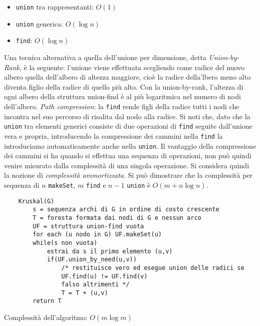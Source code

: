 \documentclass[12pt]{article}
\begin{document}
\begin{itemize}
    \item \texttt{union} tra rappresentanti: $O(1)$
    \item \texttt{union} generica: $O(\log n)$
    \item \texttt{find}: $O(\log n)$
\end{itemize}
Una tecnica alternativa a quella dell'unione per dimensione, detta \textit{Union-by-Rank}, è la seguente: l'unione viene effettuata scegliendo come radice del nuovo albero quella dell'albero di altezza maggiore, cioè la radice della'lbero meno alto diventa figlio della radice di quello più alto. Con la union-by-rank, l'altezza di ogni albero della struttura union-find è al più logaritmica nel numero di nodi dell'albero. \textit{Path compression}: la \texttt{find} rende figli della radice tutti i nodi che incontra nel suo  percorso di risalita dal nodo alla radice. Si noti che, dato che la \texttt{union} tra elementi generici consiste di  due operazioni di \texttt{find} seguite dall'unione vera e propria, introducendo la compressione dei cammini nella \texttt{find} la introduciamo automaticamente anche nella \texttt{union}. Il vantaggio della compressione dei cammini si ha quando si effettua una sequenza di operazioni, non può quindi venire misurato dalla complessità di una singola operazione. Si considera quindi la nozione di \textit{complessità ammortizzata}. Si può dimostrare che la complessità per sequenza di $n$ \texttt{makeSet}, $m$ \texttt{find} e $n-1$ \texttt{union} è $O(m+n\log n)$.
\begin{verbatim}
    Kruskal(G)
        s = sequenza archi di G in ordine di costo crescente
        T = foresta formata dai nodi di G e nessun arco
        UF = struttura union-find vuota
        for each (u nodo in G) UF.makeSet(u)
        while(s non vuota)
            estrai da s il primo elemento (u,v)
            if(UF.union_by_need(u,v))
                /* restituisce vero ed esegue union delle radici se 
                UF.find(u) != UF.find(v)
                falso altrimenti */
                T = T + (u,v)
        return T
\end{verbatim}
Complessità dell'algoritmo: $O(m\log m)$
\end{document}
